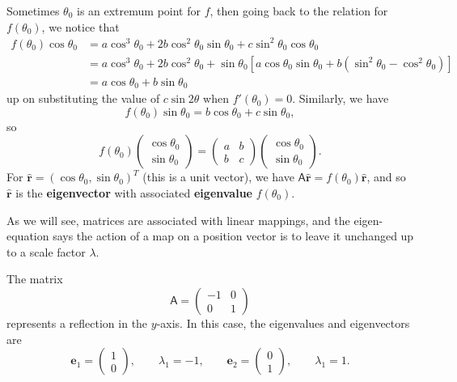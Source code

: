 \documentclass[letter-paper]{tufte-book}
\newenvironment{example}[1][Example]{\begin{trivlist}
\item[\hskip \labelsep {\bfseries #1}]}{\end{trivlist}}
\newcommand{\eb}{\boldsymbol{e}}
\newcommand\Def[1]{\textbf{#1}}
\begin{document}
Sometimes $\theta_0$ is an extremum point for $f$, then going back to the
relation for $f(\theta_0)$, we notice that
\begin{align*}
	f(\theta_0)\cos\theta_0 &= a\cos^3\theta_0 + 2b\cos^2\theta_0 \sin\theta_0
	+c\sin^2\theta_0 \cos\theta_0\\
	&= a\cos^3\theta_0 + 2b\cos^2\theta_0
	+\sin\theta_0[a\cos\theta_0 \sin\theta_0 +b(\sin^2\theta_0 -\cos^2\theta_0)]
	\\ &=a\cos\theta_0 + b\sin\theta_0
\end{align*}
up on substituting the value of $c\sin2\theta$ when $f'(\theta_0)=0$. Similarly,
we have
\begin{equation*}
	f(\theta_0)\sin\theta_0 = b\cos\theta_0 + c\sin\theta_0,
\end{equation*}
so
\begin{equation*}
	f(\theta_0)\begin{pmatrix}\cos\theta_0 \\ \sin\theta_0\end{pmatrix}
	=\begin{pmatrix}a & b\\ b & c\end{pmatrix}
	\begin{pmatrix}\cos\theta_0 \\ \sin\theta_0\end{pmatrix}.
\end{equation*}
For $\hat{\mathbf{r}}=(\cos\theta_0, \sin\theta_0)^T$ (this is a unit vector),
we have $\mathsf{A}\hat{\mathbf{r}}=f(\theta_0)\hat{\mathbf{r}}$, and so
$\hat{\mathbf{r}}$ is the \Def{eigenvector} with associated
\Def{eigenvalue} $f(\theta_0)$.

As we will see, matrices are associated with linear mappings, and the
eigen-equation says the action of a map on a position vector is to leave it
unchanged up to a scale factor $\lambda$.
\begin{example}
	The matrix
	\begin{equation*}
		\mathsf{A}=\begin{pmatrix}-1 & 0\\ 0 & 1\end{pmatrix}
	\end{equation*}
	represents a reflection in the $y$-axis. In this case, the eigenvalues and
	eigenvectors are
	\begin{equation*}
		\eb_1=\begin{pmatrix}1\\0\end{pmatrix},\qquad \lambda_1=-1,\qquad
		\eb_2=\begin{pmatrix}0\\1\end{pmatrix},\qquad \lambda_1=1.
	\end{equation*}
\end{example}
\end{document}
